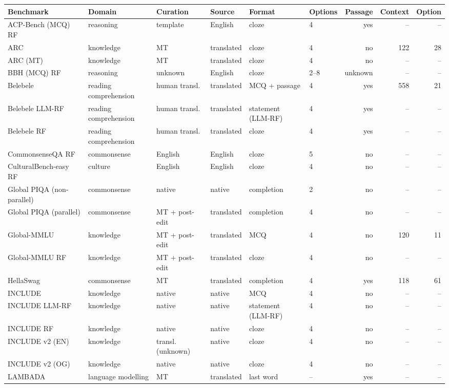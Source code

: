 \begin{tabular}{llllllrrr}
\toprule
Benchmark & Domain & Curation & Source & Format & Options & Passage & Context & Option \\
\midrule
ACP-Bench (MCQ) RF & reasoning & template & English & cloze & 4 & yes & -- & -- \\
ARC & knowledge & MT & translated & cloze & 4 & no & 122 & 28 \\
ARC (MT) & knowledge & MT & translated & cloze & 4 & no & -- & -- \\
BBH (MCQ) RF & reasoning & unknown & English & cloze & 2--8 & unknown & -- & -- \\
Belebele & reading comprehension & human transl. & translated & MCQ + passage & 4 & yes & 558 & 21 \\
Belebele LLM-RF & reading comprehension & human transl. & translated & statement (LLM-RF) & 4 & yes & -- & -- \\
Belebele RF & reading comprehension & human transl. & translated & cloze & 4 & yes & -- & -- \\
CommonsenseQA RF & commonsense & English & English & cloze & 5 & no & -- & -- \\
CulturalBench-easy RF & culture & English & English & cloze & 4 & no & -- & -- \\
Global PIQA (non-parallel) & commonsense & native & native & completion & 2 & no & -- & -- \\
Global PIQA (parallel) & commonsense & MT + post-edit & translated & completion & 4 & no & -- & -- \\
Global-MMLU & knowledge & MT + post-edit & translated & MCQ & 4 & no & 120 & 11 \\
Global-MMLU RF & knowledge & MT + post-edit & translated & cloze & 4 & no & -- & -- \\
HellaSwag & commonsense & MT & translated & completion & 4 & yes & 118 & 61 \\
INCLUDE & knowledge & native & native & MCQ & 4 & no & -- & -- \\
INCLUDE LLM-RF & knowledge & native & native & statement (LLM-RF) & 4 & no & -- & -- \\
INCLUDE RF & knowledge & native & native & cloze & 4 & no & -- & -- \\
INCLUDE v2 (EN) & knowledge & transl. (unknown) & native & cloze & 4 & no & -- & -- \\
INCLUDE v2 (OG) & knowledge & native & native & cloze & 4 & no & -- & -- \\
LAMBADA & language modelling & MT & translated & last word & -- & yes & -- & -- \\

\end{tabular}
